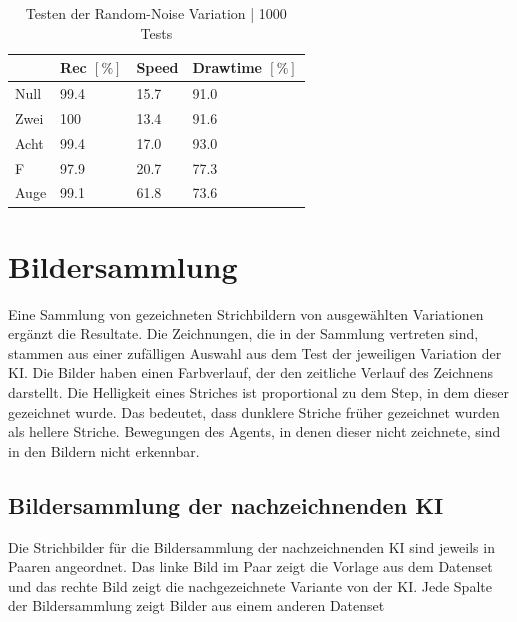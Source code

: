\begin{table}[!ht]
    \centering
    \caption{Testen der Random-Noise Variation | 1000 Tests}\label{tab:gen-noisy}
    \begin{tabular}{|l|l|l|l|}
    \hline
        ~ & Rec $[\%]$ & Speed & Drawtime $[\%]$ \\ \hline
        Null & 99.4 & 15.7 & 91.0 \\ \hline
        Zwei & 100 & 13.4 & 91.6 \\ \hline
        Acht & 99.4 & 17.0 & 93.0 \\ \hline
        F & 97.9 & 20.7 & 77.3 \\ \hline
        Auge & 99.1 & 61.8 & 73.6 \\ \hline
    \end{tabular}
\end{table}




\section{Bildersammlung}\label{chap:r_bild} Eine Sammlung von gezeichneten
Strichbildern von ausgewählten Variationen ergänzt die Resultate. Die Zeichnungen, die in der Sammlung
vertreten sind, stammen aus einer zufälligen Auswahl aus dem Test der jeweiligen
Variation der KI. Die Bilder haben einen Farbverlauf, der den zeitliche Verlauf
des Zeichnens darstellt. Die Helligkeit eines Striches ist proportional zu dem
Step, in dem dieser gezeichnet wurde. Das bedeutet, dass dunklere Striche früher
gezeichnet wurden als hellere Striche. Bewegungen des Agents, in denen dieser
nicht zeichnete, sind in den Bildern nicht erkennbar.


\subsection{Bildersammlung der nachzeichnenden KI}\label{sub:r_bild_nach}

Die Strichbilder für die Bildersammlung der nachzeichnenden KI sind jeweils in Paaren
angeordnet. Das linke Bild im Paar zeigt die Vorlage aus dem Datenset und das
rechte Bild zeigt die nachgezeichnete Variante von der KI. Jede Spalte der
Bildersammlung zeigt Bilder aus einem anderen Datenset

